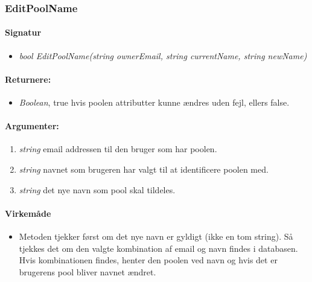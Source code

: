\subsubsection{EditPoolName}%





\paragraph{Signatur}
\begin{itemize}
	\item \textit{bool EditPoolName(string ownerEmail, string currentName, string newName)}
\end{itemize}

\paragraph{Returnere:}
\begin{itemize}
	\item \textit{Boolean}, true hvis poolen attributter kunne ændres uden fejl, ellers false.
\end{itemize}

\paragraph{Argumenter:}
\begin{enumerate}
	\item \textit{string} email addressen til den bruger som har poolen.
	\item \textit{string} navnet som brugeren har valgt til at identificere poolen med.
	\item \textit{string} det nye navn som pool skal tildeles.
\end{enumerate}

\paragraph{Virkemåde}
\begin{itemize}
	\item Metoden tjekker først om det nye navn er gyldigt (ikke en tom string). Så tjekkes det om den valgte kombination af email og navn findes i databasen. Hvis kombinationen findes, henter den poolen ved navn og hvis det er brugerens pool bliver navnet ændret.
\end{itemize}





